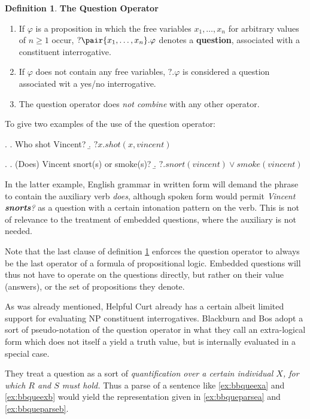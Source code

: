 \documentclass[11pt,a4paper]{article}
\newcommand{\stress}{\textbf} %
\newcommand{\term}[1]{\textsf{\textbf{#1}}} %
\newcommand{\pn}{\textsf} %
\newcommand{\example}{\textit} %
\theoremstyle{remark}
\theoremstyle{remark}
\theoremstyle{definition}
\newtheorem{definition}[thm]{Definition}
\begin{document}
\begin{definition}\label{def:qop}
  \stress{The Question Operator}
  \begin{enumerate}
    \item If $\varphi$ is a proposition in which the free variables
    $x_1,\ldots,x_n$ for arbitrary values of $n \geq 1$ occur,
    $?\pair{x_1,\ldots,x_n}.\varphi$ denotes a \term{question}, associated with
    a constituent interrogative.
    \item If $\varphi$ does not contain any free variables, $?.\varphi$ is
    considered a question associated wit a yes/no interrogative.
    \item The question operator does \emph{not combine} with any other operator.
  \end{enumerate}
\end{definition}

To give two examples of the use of the question operator:

\ex. \a. Who shot Vincent?
\b. $?x.shot(x,vincent)$

\ex. \a. (Does) Vincent snort(s) or smoke(s)?
\b. $?.snort(vincent) \vee smoke(vincent)$

In the latter example, English grammar in written form will demand the phrase to
contain the auxiliary verb \emph{does}, although spoken form would permit
\example{Vincent \stress{snorts}?} as a question with a certain intonation
pattern on the verb. This is not of relevance to the treatment of embedded
questions, where the auxiliary is not needed.

Note that the last clause of definition \ref{def:qop} enforces the question operator to
always be the last operator of a formula of propositional logic. Embedded
questions will thus not have to operate on the questions directly, but rather on
their value (answers), or the set of propositions they denote.

As was already mentioned, \pn{Helpful Curt} already has a certain albeit limited
support for evaluating NP constituent interrogatives. Blackburn and Bos adopt a
sort of pseudo-notation of the question operator in what they call an
extra-logical form which does not itself a yield a truth value, but is
internally evaluated in a special case.


They treat a question as a sort of \emph{quantification
over a certain individual $X$, for which $R$ and $S$ must hold.} Thus a parse of
a sentence like \ref{ex:bbqueexa} and \ref{ex:bbqueexb} would yield the representation given in
\ref{ex:bbqueparsea} and \ref{ex:bbqueparseb}.
\end{document}

